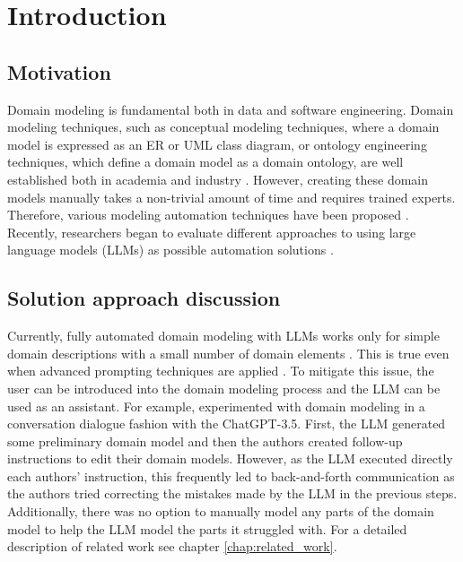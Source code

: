 \chapter*{Introduction}


\section*{Motivation}

Domain modeling is fundamental both in data and software engineering. Domain modeling techniques, such as conceptual modeling techniques, where a domain model is expressed as an ER or UML class diagram, or ontology engineering techniques, which define a domain model as a domain ontology, are well established both in academia and industry \cite{Verdonck2018}. However, creating these domain models manually takes a non-trivial amount of time and requires trained experts. Therefore, various modeling automation techniques have been proposed \cite{Sonbol2022}. Recently, researchers began to evaluate different approaches to using large language models (LLMs) as possible automation solutions \cite{Chen2023,Saeedizade2024}.


\section*{Solution approach discussion}

Currently, fully automated domain modeling with LLMs works only for simple domain descriptions with a small number of domain elements \cite{Camara2023}. This is true even when advanced prompting techniques are applied \cite{Chen2023,Saeedizade2024}. To mitigate this issue, the user can be introduced into the domain modeling process \cite{Camara2023} and the LLM can be used as an assistant. For example, \citet{Camara2023} experimented with domain modeling in a conversation dialogue fashion with the ChatGPT-3.5. First, the LLM generated some preliminary domain model and then the authors created follow-up instructions to edit their domain models. However, as the LLM executed directly each authors' instruction, this frequently led to back-and-forth communication as the authors tried correcting the mistakes made by the LLM in the previous steps. Additionally, there was no option to manually model any parts of the domain model to help the LLM model the parts it struggled with. For a detailed description of related work see chapter \ref{chap:related_work}.


